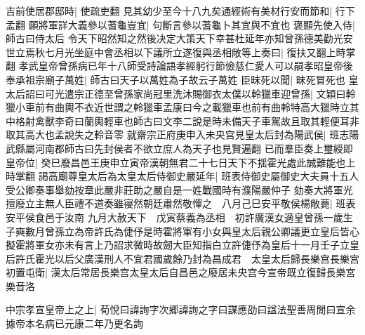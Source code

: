 吉前使居郡邸時|{
	使疏吏翻}
見其幼少至今十八九矣通經術有美材行安而節和|{
	行下孟翻}
願將軍詳大義參以蓍龜豈宜|{
	句斷言參以蓍龜卜其宜與不宜也}
褒顯先使入侍|{
	師古曰侍太后}
令天下昭然知之然後决定大策天下幸甚杜延年亦知曾孫德美勸光安世立焉秋七月光坐庭中會丞相以下議所立遂復與丞相敞等上奏曰|{
	復扶又翻上時掌翻}
孝武皇帝曾孫病已年十八師受詩論語孝經躬行節儉慈仁愛人可以嗣孝昭皇帝後奉承祖宗廟子萬姓|{
	師古曰天子以萬姓為子故云子萬姓}
臣昧死以聞|{
	昧死冒死也}
皇太后詔曰可光遣宗正德至曾孫家尚冠里洗沐賜御衣太僕以軨獵車迎曾孫|{
	文穎曰軨獵小車前有曲輿不衣近世謂之軨獵車孟康曰今之載獵車也前有曲軨特高大獵時立其中格射禽獸李奇曰蘭輿輕車也師古曰文李二說是時未備天子車駕故且取其輕便耳非取其高大也孟說失之軨音零}
就齋宗正府庚申入未央宫見皇太后封為陽武侯|{
	班志陽武縣屬河南郡師古曰先封侯者不欲立庶人為天子也見賢遍翻}
已而羣臣奏上璽綬即皇帝位|{
	癸巳廢昌邑王庚申立寅帝漢朝無君二十七日天下不揺霍光處此誠難能也上時掌翻}
謁高廟尊皇太后為太皇太后侍御史嚴延年|{
	班表侍御史屬御史大夫員十五人受公卿奏事舉劾按章此嚴非莊助之嚴自是一姓戰國時有濮陽嚴仲子}
劾奏大將軍光擅廢立主無人臣禮不道奏雖寑然朝廷肅然敬憚之　八月己巳安平敬侯楊敞薨|{
	班表安平侯食邑于汝南}
九月大赦天下　戊寅蔡義為丞相　初許廣漢女適皇曾孫一歲生子奭數月曾孫立為帝許氏為倢伃是時霍將軍有小女與皇太后親公卿議更立皇后皆心擬霍將軍女亦未有言上乃詔求微時故劒大臣知指白立許倢伃為皇后十一月壬子立皇后許氏霍光以后父廣漢刑人不宜君國歲餘乃封為昌成君　太皇太后歸長樂宫長樂宫初置屯衛|{
	漢太后常居長樂宫太皇太后自昌邑之廢居未央宫今宣帝既立復歸長樂宮樂音洛}


中宗孝宣皇帝上之上|{
	荀悅曰諱詢字次郷諱詢之字曰謀應劭曰諡法聖善周閒曰宣余據帝本名病已元康二年乃更名詢}


